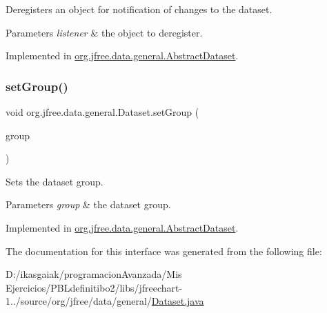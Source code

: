 Deregisters an object for notification of changes to the dataset.


\begin{DoxyParams}{Parameters}
{\em listener} & the object to deregister. \\
\hline
\end{DoxyParams}


Implemented in \mbox{\hyperlink{classorg_1_1jfree_1_1data_1_1general_1_1_abstract_dataset_ab0a2ba36de45585c70212701459b5979}{org.\+jfree.\+data.\+general.\+Abstract\+Dataset}}.

\mbox{\label{interfaceorg_1_1jfree_1_1data_1_1general_1_1_dataset_a48843f06c21e29847a62db0107b40138}} 
\subsubsection{\texorpdfstring{set\+Group()}{setGroup()}}
{\footnotesize\ttfamily void org.\+jfree.\+data.\+general.\+Dataset.\+set\+Group (\begin{DoxyParamCaption}\item[{\mbox{\hyperlink{classorg_1_1jfree_1_1data_1_1general_1_1_dataset_group}{Dataset\+Group}}}]{group }\end{DoxyParamCaption})}

Sets the dataset group.


\begin{DoxyParams}{Parameters}
{\em group} & the dataset group. \\
\hline
\end{DoxyParams}


Implemented in \mbox{\hyperlink{classorg_1_1jfree_1_1data_1_1general_1_1_abstract_dataset_ab0442a73adac8fbb69594378b5e354b0}{org.\+jfree.\+data.\+general.\+Abstract\+Dataset}}.



The documentation for this interface was generated from the following file\+:\begin{DoxyCompactItemize}
\item 
D\+:/ikasgaiak/programacion\+Avanzada/\+Mis Ejercicios/\+P\+B\+Ldefinitibo2/libs/jfreechart-\/1../source/org/jfree/data/general/\mbox{\hyperlink{_dataset_8java}{Dataset.\+java}}\end{DoxyCompactItemize}
